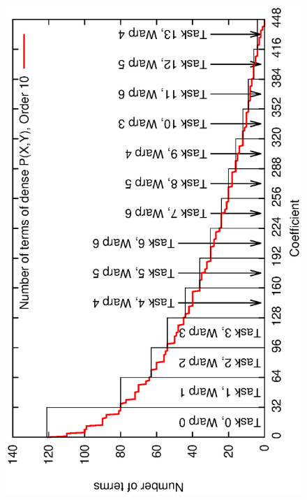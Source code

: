 \documentclass[oribibl]{llncs2e/llncs}
\begin{document}
\begin{itemize}
\begin{figure}[t]
\begin{center}
{        \includegraphics[scale=0.37, angle=-90]{coeffs.eps} 
}
\end{center}
\end{figure}
\end{itemize}
\end{document}
